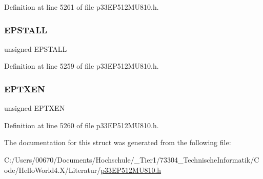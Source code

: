 Definition at line 5261 of file p33\+E\+P512\+M\+U810.\+h.

\mbox{\label{structtag_u1_e_p13_b_i_t_s_a47042104f04ebe06a23f9789bd400d7e}} 
\subsubsection{\texorpdfstring{E\+P\+S\+T\+A\+LL}{EPSTALL}}
{\footnotesize\ttfamily unsigned E\+P\+S\+T\+A\+LL}



Definition at line 5259 of file p33\+E\+P512\+M\+U810.\+h.

\mbox{\label{structtag_u1_e_p13_b_i_t_s_aa2d88c1be513e759c136823c86a355b4}} 
\subsubsection{\texorpdfstring{E\+P\+T\+X\+EN}{EPTXEN}}
{\footnotesize\ttfamily unsigned E\+P\+T\+X\+EN}



Definition at line 5260 of file p33\+E\+P512\+M\+U810.\+h.



The documentation for this struct was generated from the following file\+:\begin{DoxyCompactItemize}
\item 
C\+:/\+Users/00670/\+Documents/\+Hochschule/\+\_\+\+Tier1/73304\+\_\+\+Technische\+Informatik/\+Code/\+Hello\+World4.\+X/\+Literatur/\hyperlink{p33_e_p512_m_u810_8h}{p33\+E\+P512\+M\+U810.\+h}\end{DoxyCompactItemize}
